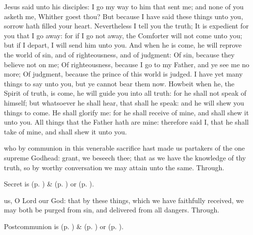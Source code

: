  Jesus said unto his disciples: I go my way to him that sent me; and none of you asketh me, Whither goest thou? But because I have said these things unto you, sorrow hath filled your heart. Nevertheless I tell you the truth; It is expedient for you that I go away: for if I go not away, the Comforter will not come unto you; but if I depart, I will send him unto you. And when he is come, he will reprove the world of sin, and of righteousness, and of judgment: Of sin, because they believe not on me; Of righteousness, because I go to my Father, and ye see me no more; Of judgment, because the prince of this world is judged. I have yet many things to say unto you, but ye cannot bear them now. Howbeit when he, the Spirit of truth, is come, he will guide you into all truth: for he shall not speak of himself; but whatsoever he shall hear, that shall he speak: and he will shew you things to come. He shall glorify me: for he shall receive of mine, and shall shew it unto you. All things that the Father hath are mine: therefore said I, that he shall take of mine, and shall shew it unto you.

\secret
{} who by communion in this venerable sacrifice hast made us partakers of the one supreme Godhead: grant, we beseech thee; that as we have the knowledge of thy truth, so by worthy conversation we may attain unto the same. Through.
\begin{rubric}
     Secret is  (p. \pageref{SPMaryInEaster}) \&   (p. \pageref{SPAgainst}) or  (p. \pageref{SPChiefBishop}).
\end{rubric}
\postcommunion
{} us, O Lord our God: that by these things, which we have faithfully received, we may both be purged from sin, and delivered from all dangers. Through.
\begin{rubric}
     Postcommunion is  (p. \pageref{SPMaryInEaster}) \&   (p. \pageref{SPAgainst}) or  (p. \pageref{SPChiefBishop}).
\end{rubric}


